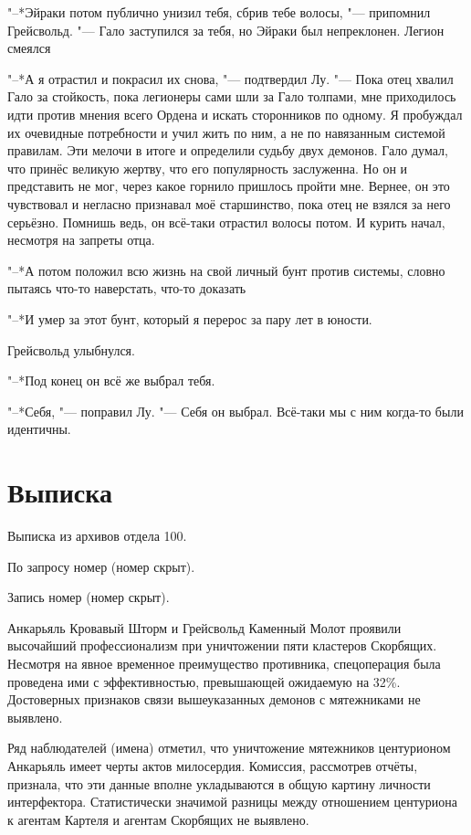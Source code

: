 \documentclass[a4paper,10pt,fleqn]{book}
\newcommand{\ldotst}{\so{...}\xspace}
\begin{document}
"--*Эйраки потом публично унизил тебя, сбрив тебе волосы, "--- припомнил Грейсвольд.
"--- Гало заступился за тебя, но Эйраки был непреклонен.
Легион смеялся\ldotst

"--*А я отрастил и покрасил их снова, "--- подтвердил Лу.
"--- Пока отец хвалил Гало за стойкость, пока легионеры сами шли за Гало толпами, мне приходилось идти против мнения всего Ордена и искать сторонников по одному.
Я пробуждал их очевидные потребности и учил жить по ним, а не по навязанным системой правилам.
Эти мелочи в итоге и определили судьбу двух демонов.
Гало думал, что принёс великую жертву, что его популярность заслуженна.
Но он и представить не мог, через какое горнило пришлось пройти мне.
Вернее, он это чувствовал и негласно признавал моё старшинство, пока отец не взялся за него серьёзно.
Помнишь ведь, он всё-таки отрастил волосы потом.
И курить начал, несмотря на запреты отца.

"--*А потом положил всю жизнь на свой личный бунт против системы, словно пытаясь что-то наверстать, что-то доказать\ldotst

"--*И умер за этот бунт, который я перерос за пару лет в юности.

Грейсвольд улыбнулся.

"--*Под конец он всё же выбрал тебя.

"--*Себя, "--- поправил Лу.
"--- Себя он выбрал.
Всё-таки мы с ним когда-то были идентичны.

\section{Выписка}

Выписка из архивов отдела 100.

По запросу номер (номер скрыт).

Запись номер (номер скрыт).

Анкарьяль Кровавый Шторм и Грейсвольд Каменный Молот проявили высочайший профессионализм при уничтожении пяти кластеров Скорбящих.
Несмотря на явное временное преимущество противника, спецоперация была проведена ими с эффективностью, превышающей ожидаемую на 32\%.
Достоверных признаков связи вышеуказанных демонов с мятежниками не выявлено.

Ряд наблюдателей (имена) отметил, что уничтожение мятежников центурионом Анкарьяль имеет черты актов милосердия.
Комиссия, рассмотрев отчёты, признала, что эти данные вполне укладываются в общую картину личности интерфектора.
Статистически значимой разницы между отношением центуриона к агентам Картеля и агентам Скорбящих не выявлено.
\end{document}
